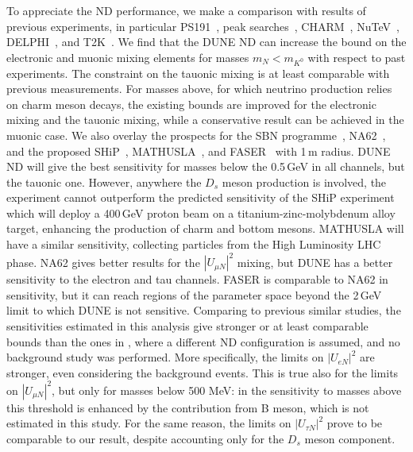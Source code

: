 To appreciate the ND performance, we make a comparison with results of previous experiments, %
in particular PS191~\cite{Bernardi:1985ny, Bernardi:1987ek}, peak searches~\cite{Artamonov:2014urb, Britton:1992pg, Britton:1992xv}, %
CHARM~\cite{Vilain:1994vg}, NuTeV~\cite{Vaitaitis:1999wq}, DELPHI~\cite{Abreu:1996pa}, and T2K~\cite{Abe:2019kgx}.
We find that the DUNE ND can increase the bound on the electronic and muonic mixing elements %
for masses $m_N < m_{K^0}$ with respect to past experiments.
The constraint on the tauonic mixing is at least comparable with previous measurements.
For masses above, for which neutrino production relies on charm meson decays, the existing bounds %
are improved for the electronic mixing and the tauonic mixing, while a conservative result %
can be achieved in the muonic case.
We also overlay the prospects for the SBN programme~\cite{Ballett:2016opr}, %
NA62~\cite{Drewes:2018irr}, and the proposed SHiP~\cite{Alekhin:2015byh}, MATHUSLA~\cite{Curtin:2018mvb}, %
and FASER~\cite{Kling:2018wct} with 1\,m radius.
DUNE ND will give the best sensitivity for masses below the 0.5\,GeV in all channels, but the tauonic one.
However, anywhere the $D_s$ meson production is involved, the experiment cannot outperform the predicted %
sensitivity of the SHiP experiment which will deploy a 400\,GeV proton beam on a titanium-zinc-molybdenum alloy %
target, enhancing the production of charm and bottom mesons.
MATHUSLA will have a similar sensitivity, collecting particles from the High Luminosity LHC phase.
NA62 gives better results for the $|U_{\mu N}|^2$ mixing, but DUNE has a better sensitivity %
to the electron and tau channels.
FASER is comparable to NA62 in sensitivity, but it can reach regions of the parameter space beyond the 2\,GeV limit %
to which DUNE is not sensitive.
Comparing to previous similar studies, the sensitivities estimated in this analysis give stronger %
or at least comparable bounds than the ones in , 
where a different ND configuration is assumed, and no background study was performed.
More specifically, the limits on $|U_{eN}|^2$ are stronger, even considering the background events.
This is true also for the limits on $|U_{\mu N}|^2$, but only for masses below 500 MeV: %
in  the sensitivity to masses above this threshold is enhanced by the contribution %
from B meson, which is not estimated in this study.
For the same reason, the limits on $|U_{\tau N}|^2$ prove to be comparable to our result, %
despite accounting only for the $D_s$ meson component.

